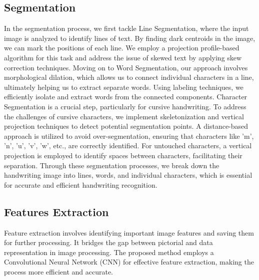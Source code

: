 \subsection{Segmentation}
In the segmentation process, we first tackle Line Segmentation, where the input image is analyzed to identify lines of text. By finding dark centroids in the image, we can mark the positions of each line. We employ a projection profile-based algorithm for this task and address the issue of skewed text by applying skew correction techniques.\newline 
Moving on to Word Segmentation, our approach involves morphological dilation, which allows us to connect individual characters in a line, ultimately helping us to extract separate words. Using labeling techniques, we efficiently isolate and extract words from the connected components.\newline 
Character Segmentation is a crucial step, particularly for cursive handwriting. To address the challenges of cursive characters, we implement skeletonization and vertical projection techniques to detect potential segmentation points. A distance-based approach is utilized to avoid over-segmentation, ensuring that characters like 'm', 'n', 'u', 'v', 'w', etc., are correctly identified. For untouched characters, a vertical projection is employed to identify spaces between characters, facilitating their separation.\newline
Through these segmentation processes, we break down the handwriting image into lines, words, and individual characters, which is essential for accurate and efficient handwriting recognition.
\subsection{Features Extraction}
Feature extraction involves identifying important image features and saving them for further processing. It bridges the gap between pictorial and data representation in image processing. The proposed method employs a Convolutional Neural Network (CNN) for effective feature extraction, making the process more efficient and accurate.

